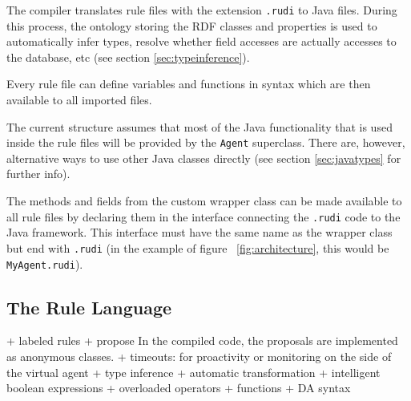 The \vonda compiler translates rule files with the extension \texttt{.rudi} to
Java files. During this process, the ontology storing the RDF classes and
properties is used to automatically infer types, resolve whether field accesses
are actually accesses to the database, etc (see section
\ref{sec:typeinference}).

Every rule file can define variables and functions in \vonda syntax which are
then available to all imported files.

The current structure assumes that most of the Java functionality that is used
inside the rule files will be provided by the \texttt{Agent} superclass. There are,
however, alternative ways to use other Java classes directly (see section \ref{sec:javatypes} for further info).

The methods and fields from the custom wrapper class can be made available to
all rule files by declaring them in the interface connecting the \texttt{.rudi}
code to the Java framework. This interface must have the same name as the
wrapper class but end with \texttt{.rudi} (in the example of figure
~\ref{fig:architecture}, this would be \texttt{MyAgent.rudi}).





\subsection{The \vonda Rule Language}

\label{sec:language}

+ labeled rules
+ propose
  In the compiled code, the proposals are implemented as anonymous classes.
+ timeouts: for proactivity or monitoring on the side of the virtual agent
+ type inference
+ automatic transformation
+ intelligent boolean expressions
+ overloaded operators
+ functions
+ DA syntax

